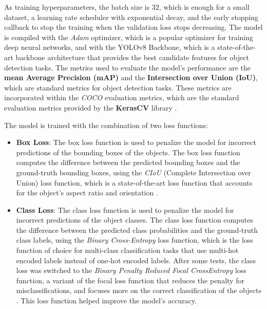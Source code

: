 As training hyperparameters, the batch size is $32$, which is enough for a small dataset,
a learning rate scheduler with exponential decay, and the early stopping callback to stop the training
when the validation loss stops decreasing. The model is compiled with the \textit{Adam} optimizer, which is a popular optimizer
for training deep neural networks, and with the YOLOv8 Backbone, which is a state-of-the-art backbone architecture
that provides the best candidate features for object detection tasks. The metrics used to evaluate the model's performance
are the \textbf{mean Average Precision (mAP)} and the \textbf{Intersection over Union (IoU)},
which are standard metrics for object detection tasks. These metrics are incorporated within the \textit{COCO} evaluation metrics,
which are the standard evaluation metrics provided by the \textbf{KerasCV} library \cite{wood2022kerascv}.

The model is trained with the combination of two loss functions:

\begin{itemize}
    \item \textbf{Box Loss}: The box loss function is used to penalize the model for incorrect predictions of the bounding
    boxes of the objects. The box loss function computes the difference between the predicted bounding boxes and the
    ground-truth bounding boxes, using the \textit{CIoU} (Complete Intersection over Union) loss function, which is a
    state-of-the-art loss function that accounts for the object's aspect ratio and orientation \cite{zheng2021ciou}.
    \item \textbf{Class Loss}: The class loss function is used to penalize the model for incorrect predictions of the
    object classes. The class loss function computes the difference between the predicted class probabilities and the
    ground-truth class labels, using the \textit{Binary Cross-Entropy} loss function, which is the loss function of
    choice for multi-class classification tasks that use multi-hot encoded labels instead of one-hot encoded labels.
    After some tests, the class loss was switched to the \textit{Binary Penalty Reduced Focal CrossEntropy} 
    loss function, a variant of the focal loss function that reduces the penalty for misclassifications, 
    and focuses more on the correct classification of the objects \cite{law2019cornernet}. 
    This loss function helped improve the model's accuracy.
\end{itemize}

